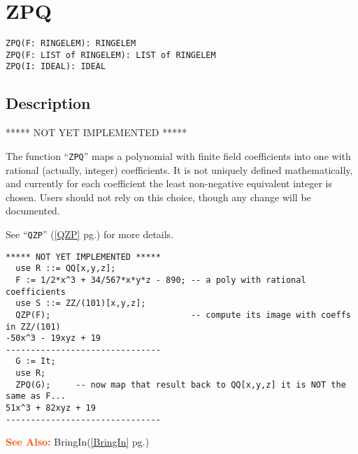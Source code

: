 \documentclass[a4paper]{mybook}
\newenvironment{command}{}{} %
\newcommand\SeeAlso{\par\textcolor{OrangeRed}{\textbf{\large See Also: }}}
\begin{document}
\section{ZPQ}
\label{ZPQ}
\begin{command} %


\begin{Verbatim}[label=syntax, rulecolor=\color{MidnightBlue},
frame=single]
ZPQ(F: RINGELEM): RINGELEM
ZPQ(F: LIST of RINGELEM): LIST of RINGELEM
ZPQ(I: IDEAL): IDEAL
\end{Verbatim}


\subsection*{Description}

***** NOT YET IMPLEMENTED *****
\par 
The function ``\verb&ZPQ&'' maps a polynomial with finite field coefficients
into one with rational (actually, integer) coefficients.  It is not
uniquely defined mathematically, and currently for each coefficient
the least non-negative equivalent integer is chosen.
Users should not rely on this choice, though any change will be
documented.
\par 
See ``\verb&QZP&'' (\ref{QZP} pg.\pageref{QZP}) for more details.
\begin{Verbatim}[label=example, rulecolor=\color{PineGreen}, frame=single]
***** NOT YET IMPLEMENTED *****
  use R ::= QQ[x,y,z];
  F := 1/2*x^3 + 34/567*x*y*z - 890; -- a poly with rational coefficients
  use S ::= ZZ/(101)[x,y,z];
  QZP(F);                            -- compute its image with coeffs in ZZ/(101)
-50x^3 - 19xyz + 19
-------------------------------
  G := It;
  use R;
  ZPQ(G);     -- now map that result back to QQ[x,y,z] it is NOT the same as F...
51x^3 + 82xyz + 19
-------------------------------
\end{Verbatim}


\SeeAlso %
  BringIn(\ref{BringIn} pg.\pageref{BringIn})
\end{command} %
\end{document}
